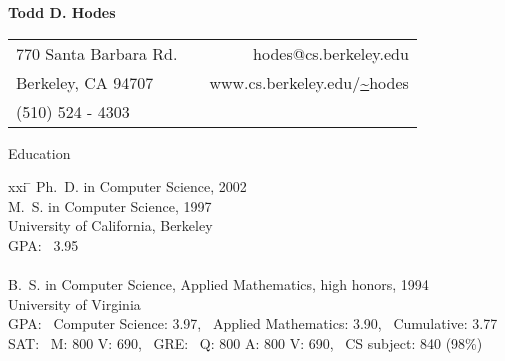 \setlength{\oddsidemargin}{0.25 in}
\setlength{\evensidemargin}{-0.25 in}
\setlength{\topmargin}{-0.95 in}
\setlength{\textwidth}{6.5 in}
\setlength{\textheight}{10 in}
\setlength{\headsep}{0.35 in}
\setlength{\parindent}{0 in}
\setlength{\parskip}{0.01 in}


\addtolength{\evensidemargin}{-15pt}
\addtolength{\oddsidemargin}{-15pt}

\pagestyle{empty}


\begin{center} \bf
\Large
                               Todd D. Hodes
\medskip
\normalsize


\begin{tabular}{lp{3in}r}
770 Santa Barbara Rd.  & & hodes@cs.berkeley.edu \\
Berkeley, CA  94707 & & www.cs.berkeley.edu/\url{~}hodes \\
(510)  524 - 4303 \\
\end{tabular}

\end{center}

\bigskip


\begin{bf} \large
Education \\[-18pt]
\end{bf}

\begin{tabbing}
xxi \= \kill
\>   Ph.\ D. in Computer Science, 2002 \\
\>   M.\ S. in  Computer Science, 1997 \\
\>   University of California, Berkeley \\
\>   GPA:  \, 3.95 \\
\smallskip \\[-6pt]
\>   B.\ S. in Computer Science, Applied Mathematics, high honors, 1994 \\
\>   University of Virginia \\
\>   GPA: \, Computer Science: 3.97, \, Applied Mathematics: 3.90, \, 
          Cumulative: 3.77 \\
\>   SAT: \, M: 800 V: 690, \, GRE: \, Q: 800 A: 800 V: 690, \, 
          CS subject: 840 (98\%)\\
\end{tabbing}


